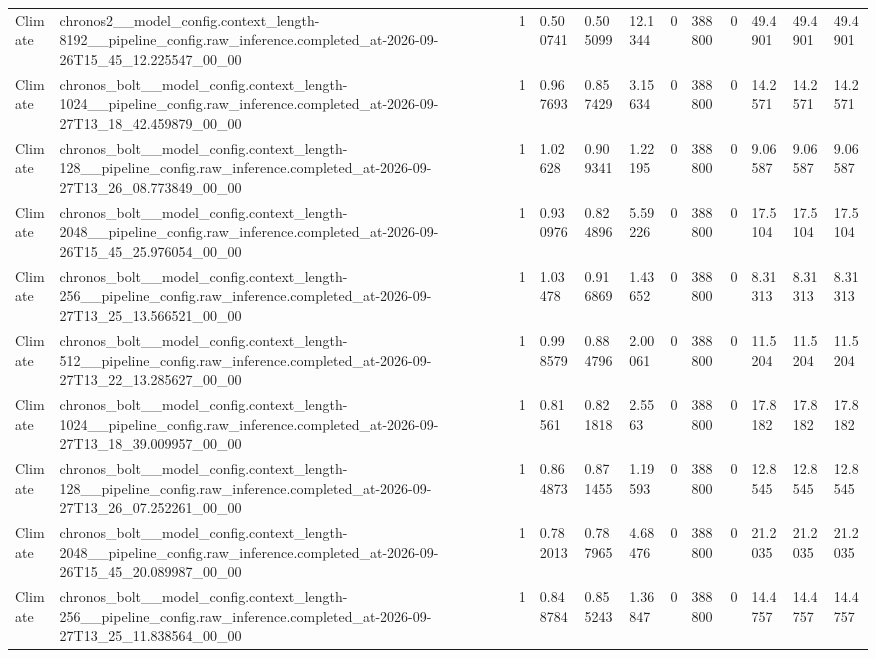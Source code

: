 \begin{tabular}{llllllllllll}
Climate & chronos2\_\_model\_config.context\_length-8192\_\_pipeline\_config.raw\_inference.completed\_at-2026-09-26T15\_45\_12.225547\_00\_00 & 1 & 0.500741 & 0.505099 & 12.1344 & 0 & 388800 & 0 & 49.4901 & 49.4901 & 49.4901 \\
Climate & chronos\_bolt\_\_model\_config.context\_length-1024\_\_pipeline\_config.raw\_inference.completed\_at-2026-09-27T13\_18\_42.459879\_00\_00 & 1 & 0.967693 & 0.857429 & 3.15634 & 0 & 388800 & 0 & 14.2571 & 14.2571 & 14.2571 \\
Climate & chronos\_bolt\_\_model\_config.context\_length-128\_\_pipeline\_config.raw\_inference.completed\_at-2026-09-27T13\_26\_08.773849\_00\_00 & 1 & 1.02628 & 0.909341 & 1.22195 & 0 & 388800 & 0 & 9.06587 & 9.06587 & 9.06587 \\
Climate & chronos\_bolt\_\_model\_config.context\_length-2048\_\_pipeline\_config.raw\_inference.completed\_at-2026-09-26T15\_45\_25.976054\_00\_00 & 1 & 0.930976 & 0.824896 & 5.59226 & 0 & 388800 & 0 & 17.5104 & 17.5104 & 17.5104 \\
Climate & chronos\_bolt\_\_model\_config.context\_length-256\_\_pipeline\_config.raw\_inference.completed\_at-2026-09-27T13\_25\_13.566521\_00\_00 & 1 & 1.03478 & 0.916869 & 1.43652 & 0 & 388800 & 0 & 8.31313 & 8.31313 & 8.31313 \\
Climate & chronos\_bolt\_\_model\_config.context\_length-512\_\_pipeline\_config.raw\_inference.completed\_at-2026-09-27T13\_22\_13.285627\_00\_00 & 1 & 0.998579 & 0.884796 & 2.00061 & 0 & 388800 & 0 & 11.5204 & 11.5204 & 11.5204 \\
Climate & chronos\_bolt\_\_model\_config.context\_length-1024\_\_pipeline\_config.raw\_inference.completed\_at-2026-09-27T13\_18\_39.009957\_00\_00 & 1 & 0.81561 & 0.821818 & 2.5563 & 0 & 388800 & 0 & 17.8182 & 17.8182 & 17.8182 \\
Climate & chronos\_bolt\_\_model\_config.context\_length-128\_\_pipeline\_config.raw\_inference.completed\_at-2026-09-27T13\_26\_07.252261\_00\_00 & 1 & 0.864873 & 0.871455 & 1.19593 & 0 & 388800 & 0 & 12.8545 & 12.8545 & 12.8545 \\
Climate & chronos\_bolt\_\_model\_config.context\_length-2048\_\_pipeline\_config.raw\_inference.completed\_at-2026-09-26T15\_45\_20.089987\_00\_00 & 1 & 0.782013 & 0.787965 & 4.68476 & 0 & 388800 & 0 & 21.2035 & 21.2035 & 21.2035 \\
Climate & chronos\_bolt\_\_model\_config.context\_length-256\_\_pipeline\_config.raw\_inference.completed\_at-2026-09-27T13\_25\_11.838564\_00\_00 & 1 & 0.848784 & 0.855243 & 1.36847 & 0 & 388800 & 0 & 14.4757 & 14.4757 & 14.4757 \\

\end{tabular}
